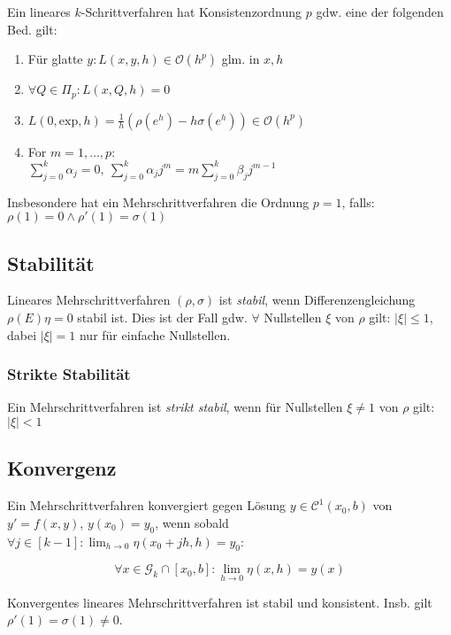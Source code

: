 Ein lineares $k$-Schrittverfahren hat Konsistenzordnung $p$ gdw. eine der folgenden Bed. gilt:

\begin{enumerate}[label=(\alph*)]
\item Für glatte $y: L(x,y,h) \in \mathcal{O}(h^p)$ glm. in $x, h$
\item $\forall Q \in \Pi_p : L(x,Q,h) = 0$
\item $L(0,\text{exp},h) = \frac{1}{h}(\rho(e^h)-h\sigma(e^h)) \in \mathcal{O}(h^p)$
\item For $m = 1, \dots, p$: \\ $\sum_{j=0}^k \alpha_j = 0, \ \sum_{j=0}^k \alpha_j j^m = m \sum_{j=0}^k \beta_j j^{m-1}$
\end{enumerate}

Insbesondere hat ein Mehrschrittverfahren die Ordnung $p=1$, falls: $\rho(1) = 0 \land \rho'(1) = \sigma(1)$

\subsection*{Stabilität}

Lineares Mehrschrittverfahren $(\rho,\sigma)$ ist \emph{stabil}, wenn Differenzengleichung $\rho(E)\eta=0$ stabil ist. Dies ist der Fall gdw. $\forall$ Nullstellen $\xi$ von $\rho$ gilt: $|\xi| \leq 1$, dabei $|\xi|=1$ nur für einfache Nullstellen.

\subsubsection*{Strikte Stabilität}

Ein Mehrschrittverfahren ist \emph{strikt stabil}, wenn für Nullstellen $\xi \neq 1$ von $\rho$ gilt: $|\xi| < 1$

\subsection*{Konvergenz}

Ein Mehrschrittverfahren konvergiert gegen Lösung $y \in \mathcal{C}^1(x_0,b)$ von $y'=f(x,y)$, $y(x_0)=y_0$, wenn sobald $\forall j \in [k-1] : \lim_{h \to 0} \eta(x_0+jh,h)=y_0$:

$$\forall x \in \mathcal{G}_k \cap [x_0,b] : \lim_{h \to 0} \eta(x,h) = y(x)$$

Konvergentes lineares Mehrschrittverfahren ist stabil und konsistent. Insb. gilt $\rho'(1)=\sigma(1) \neq 0$.


